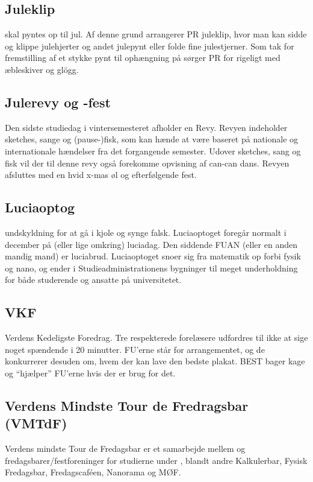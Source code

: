 \subsection{Juleklip}
\TKET skal pyntes op til jul. Af denne grund arrangerer PR juleklip, hvor man kan sidde og klippe julehjerter og andet julepynt eller folde fine julestjerner. Som tak for fremstilling af et stykke pynt til ophængning på \TKET sørger PR for rigeligt med æbleskiver og glögg.

\subsection{Julerevy og -fest}
Den sidste studiedag i vintersemesteret afholder \TKET en Revy. Revyen indeholder sketches, sange og (pause-)fisk, som kan hænde at være baseret på nationale og internationale hændelser fra det forgangende semester. Udover sketches, sang og fisk vil der til denne revy også forekomme opvisning af can-can dans. Revyen afsluttes med en hvid x-mas øl og efterfølgende fest.

\subsection{Luciaoptog}
\TKETs undskyldning for at gå i kjole og synge falsk. Luciaoptoget foregår normalt i december på (eller lige omkring) luciadag. Den siddende FUAN (eller en anden mandig mand) er luciabrud. Luciaoptoget snoer sig fra matematik op forbi fysik og nano, og ender i Studieadministrationens bygninger til meget underholdning for både studerende og ansatte på universitetet.

\newpage

\subsection{VKF}
Verdens Kedeligste Foredrag. Tre respekterede forelæsere udfordres til ikke at sige noget spændende i 20 minutter. FU'erne står for arrangementet, og de konkurrerer desuden om, hvem der kan lave den bedste plakat. BEST bager kage og ``hjælper'' FU'erne hvis der er brug for det.

\subsection{Verdens Mindste Tour de Fredragsbar (VMTdF)}
Verdens mindste Tour de Fredagsbar er et samarbejde mellem \TKET og fredagsbarer/festforeninger for studierne under \TKET, blandt andre Kalkulerbar, Fysisk Fredagsbar, Fredagscaféen, Nanorama og MØF.

